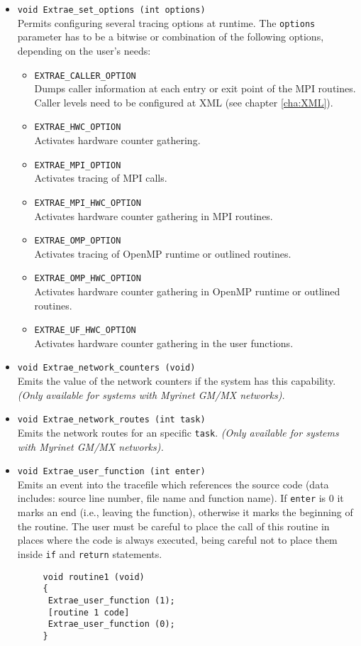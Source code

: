 \begin{itemize}
 \item {\tt void Extrae\_set\_options (int options)}\\
  Permits configuring several tracing options at runtime. The {\tt options} parameter has to be a bitwise or combination of the following options, depending on the user's needs:
  \begin{itemize}
   \item {\tt EXTRAE\_CALLER\_OPTION}\\
    Dumps caller information at each entry or exit point of the MPI routines. Caller levels need to be configured at XML (see chapter \ref{cha:XML}).
   \item {\tt EXTRAE\_HWC\_OPTION}\\
    Activates hardware counter gathering.
   \item {\tt EXTRAE\_MPI\_OPTION}\\
    Activates tracing of MPI calls.
   \item {\tt EXTRAE\_MPI\_HWC\_OPTION}\\
    Activates hardware counter gathering in MPI routines.
   \item {\tt EXTRAE\_OMP\_OPTION}\\
    Activates tracing of OpenMP runtime or outlined routines.
   \item {\tt EXTRAE\_OMP\_HWC\_OPTION}\\
    Activates hardware counter gathering in OpenMP runtime or outlined routines.
   \item {\tt EXTRAE\_UF\_HWC\_OPTION}\\
    Activates hardware counter gathering in the user functions.
  \end{itemize}

 \item {\tt void Extrae\_network\_counters (void)}\\
  Emits the value of the network counters if the system has this capability. {\em (Only available for systems with Myrinet GM/MX networks).}

 \item {\tt void Extrae\_network\_routes (int task)}\\
  Emits the network routes for an specific {\tt task}. {\em (Only available for systems with Myrinet GM/MX networks).}

 \item {\tt void Extrae\_user\_function (int enter)}\\
  Emits an event into the tracefile which references the source code (data includes: source line number, file name and function name). If {\tt enter} is 0 it marks an end (i.e., leaving the function), otherwise it marks the beginning of the routine. The user must be careful to place the call of this routine in places where the code is always executed, being careful not to place them inside {\tt if} and {\tt return} statements.
    \begin{verbatim}
     void routine1 (void)
     {
      Extrae_user_function (1);
      [routine 1 code]
      Extrae_user_function (0);
     }


\end{verbatim}
\end{itemize}
